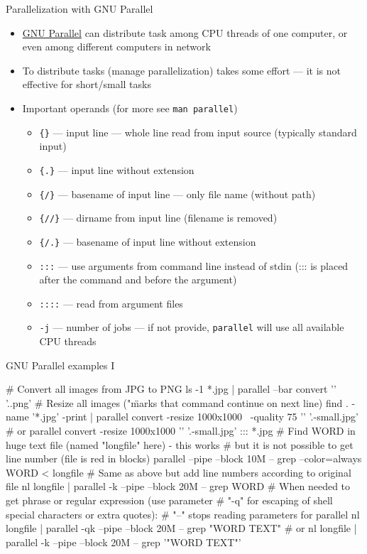 \documentclass[hyperref={bookmarks=true, unicode=true, colorlinks=true, pdftitle={Linux, command line and MetaCentrum}, plainpages=false, pdfauthor={Vojtech Zeisek}, pdfsubject={Course about use of Linux command line, writing shell scripts and using MetaCentrum of CESNET}, pdfcreator={XeLaTeX, http://www.xelatex.org/}, pdfkeywords={Linux, GNU, BASH, shell, command line, MetaCentrum}, linkcolor=Sienna, anchorcolor=black, citecolor=green, filecolor=magenta, menucolor=Sienna, urlcolor=cyan, pdftex}, compress, ucs, xelatex, xcolor=svgnames, 11pt]{beamer}
\begin{document}
\begin{frame}{Parallelization with GNU Parallel}
\begin{itemize}
  \item \href{https://www.gnu.org/software/parallel/}{GNU Parallel} can distribute task among CPU threads of one computer, or even among different computers in network
  \item To distribute tasks (manage parallelization) takes some effort --- it is not effective for short/small tasks
  \item Important operands (for more see \texttt{man parallel})
  \begin{itemize}
    \item \texttt{\{\}} --- input line --- whole line read from input source (typically standard input)
    \item \texttt{\{.\}} --- input line without extension
    \item \texttt{\{/\}} --- basename of input line --- only file name (without path)
    \item \texttt{\{//\}} --- dirname from input line (filename is removed)
    \item \texttt{\{/.\}} --- basename of input line without extension
    \item \texttt{:::} --- use arguments from command line instead of stdin (::: is placed after the command and before the argument)
    \item \texttt{::::} --- read from argument files
    \item \texttt{-j} --- number of jobs --- if not provide, \texttt{parallel} will use all available CPU threads
  \end{itemize}
\end{itemize}
\end{frame}

\begin{frame}[fragile]{GNU Parallel examples I}
  \begin{bashcode}
    # Convert all images from JPG to PNG
    ls -1 *.jpg | parallel --bar convert '{}' '{.}.png'
    # Resize all images ("\" marks that command continue on next line)
    find . -name '*.jpg' -print | parallel convert -resize 1000x1000 \
      -quality 75 '{}' '{.}-small.jpg' # or
    parallel convert -resize 1000x1000 '{}' '{.}-small.jpg' ::: *.jpg
    # Find WORD in huge text file (named "longfile" here) - this works
    # but it is not possible to get line number (file is red in blocks)
    parallel --pipe --block 10M -- grep --color=always WORD < longfile
    # Same as above but add line numbers according to original file
    nl longfile | parallel -k --pipe --block 20M -- grep WORD
    # When needed to get phrase or regular expression (use parameter
    # "-q" for escaping of shell special characters or extra quotes):
    # "--" stops reading parameters for parallel
    nl longfile | parallel -qk --pipe --block 20M -- grep "WORD TEXT" # or
    nl longfile | parallel -k --pipe --block 20M -- grep '"WORD TEXT"'
  \end{bashcode}
\end{frame}
\end{document}
